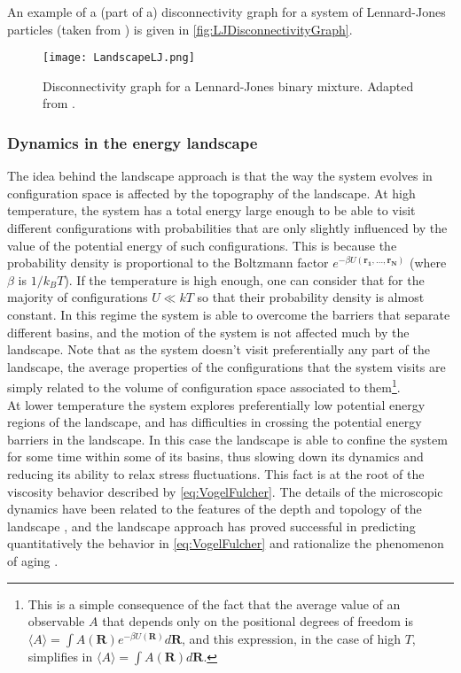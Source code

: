 An example of a (part of a) disconnectivity graph for a system of Lennard-Jones particles (taken from \cite{desouza2009connectivity}) is given in \autoref{fig:LJDisconnectivityGraph}.

\begin{figure} 
\centering 
\texttt{[image: LandscapeLJ.png]} 
\caption{Disconnectivity graph for a Lennard-Jones binary mixture. Adapted from \cite{desouza2009connectivity}. \label{fig:LJDisconnectivityGraph}}
\end{figure}

\subsubsection{Dynamics in the energy landscape}

The idea behind the landscape approach is that the way the system evolves in configuration space is affected by the topography of the landscape. 
At high temperature, the system has a total energy large enough to be able to visit different configurations with probabilities that are only slightly influenced by the value of the potential energy of such configurations. This is because the probability density is proportional to the Boltzmann factor $e^{-\beta U(\mathbf{r_{1}, \ldots, r_{N}})}$  (where $\beta$ is $1/k_{B} T$). If the temperature is high enough, one can consider that for the majority of configurations $U \ll kT$ so that their probability density is almost constant. In this regime the system is able to overcome the barriers that separate different basins, and the motion of the system is not affected much by the landscape. Note that as the system doesn't visit preferentially any part of the landscape, the average properties of the configurations that the system visits are simply related to the volume of configuration space associated to them\footnote{This is a simple consequence of the fact that the average value of an observable $A$ that depends only on the positional degrees of freedom is $\langle A \rangle = \int A(\mathbf{R}) e^{-\beta U(\mathbf{R})} d\mathbf{R}$, and this expression, in the case of high $T$, simplifies in $\langle A \rangle = \int A(\mathbf{R}) d\mathbf{R}$.}.\\
At lower temperature the system explores preferentially low potential energy regions of the landscape, and has difficulties in crossing the potential energy barriers in the landscape. In this case the landscape is able to confine the system for some time within some of its basins, thus slowing down its dynamics and reducing its ability to relax stress fluctuations. This fact is at the root of the viscosity behavior described by \autoref{eq:VogelFulcher}.
The details of the microscopic dynamics have been related to the features of the depth and topology of the landscape \cite{doliwa2003hopping}, and the landscape approach has proved successful in predicting quantitatively the behavior in \autoref{eq:VogelFulcher} \cite{sastry2001relationship} and rationalize the phenomenon of aging \cite{mossa2004crossover}. 


